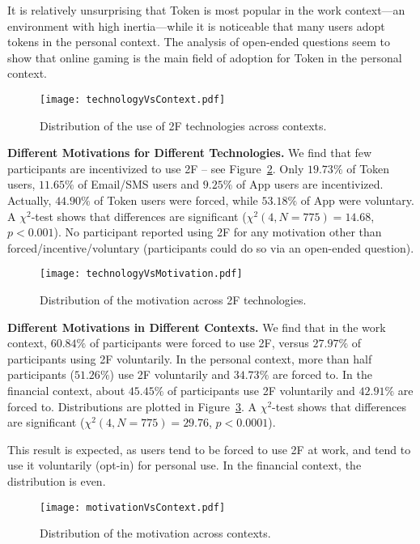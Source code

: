 \documentclass[conference]{IEEEtran}
\newcommand{\descr}[1]{\vspace{0.25cm} \noindent \textbf{#1}}
\begin{document}
It is relatively unsurprising that Token is most popular in the work context---an environment with high inertia---while it is noticeable that many users adopt tokens in the personal context.
The analysis of open-ended questions seem to show that online gaming is the main field of adoption for Token in the personal context.

\begin{figure}
\centering
  \texttt{[image: technologyVsContext.pdf]}
  \caption{Distribution of the use of 2F technologies across contexts.}
  \label{fig:technologyvscontext} 
\end{figure}


\descr{Different Motivations for Different Technologies.}
We find that few participants are incentivized to use 2F -- see Figure~\ref{fig:technologyvsmotivation}.  Only $19.73\%$ of Token users, $11.65\%$ of Email/SMS users and $9.25\%$ of App users are incentivized. Actually, $44.90\%$ of Token users were forced, while $53.18\%$ of App were voluntary. A $\chi^2$-test shows that differences are significant ($\chi^2(4, N=775)=14.68$, $p<0.001$). 
No participant reported using 2F for any motivation other than forced/incentive/voluntary (participants could do so via an open-ended question).



\begin{figure}
\centering
  \texttt{[image: technologyVsMotivation.pdf]}
  \caption{Distribution of the motivation across 2F technologies.}
  \label{fig:technologyvsmotivation} 
\end{figure}

\descr{Different Motivations in Different Contexts.}
We find that in the work context, $60.84\%$ of participants were forced to use 2F, versus $27.97\%$ of participants using 2F voluntarily. In the personal context, more than half participants ($51.26\%$) use 2F voluntarily and $34.73\%$ are forced to. In the financial context, about $45.45\%$ of participants use 2F voluntarily and $42.91\%$ are forced to. Distributions
are plotted in Figure~\ref{fig:motivationvscontext}. A $\chi^2$-test shows that differences are significant ($\chi^2(4, N=775)=29.76$, $p<0.0001$).

This result is expected, as users tend to be forced to use 2F at work, and tend to use it voluntarily (opt-in) for personal use. In the financial context, the distribution is even. 

\begin{figure}
\centering
  \texttt{[image: motivationVsContext.pdf]}
  \caption{Distribution of the motivation across contexts.}
  \label{fig:motivationvscontext} 
\end{figure}
\end{document}

